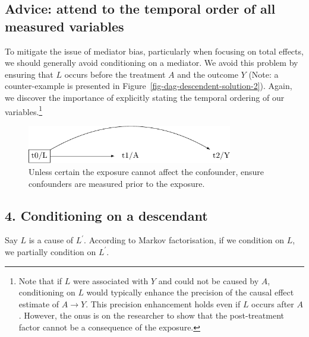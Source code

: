 \documentclass[
  singlecolumn]{report}
\begin{document}
\hypertarget{advice-attend-to-the-temporal-order-of-all-measured-variables-2}{%
\subsection{Advice: attend to the temporal order of all measured
variables}\label{advice-attend-to-the-temporal-order-of-all-measured-variables-2}}

To mitigate the issue of mediator bias, particularly when focusing on
total effects, we should generally avoid conditioning on a mediator. We
avoid this problem by ensuring that \(L\) occurs before the treatment
\(A\) and the outcome \(Y\) (Note: a counter-example is presented in
Figure~\ref{fig-dag-descendent-solution-2}). Again, we discover the
importance of explicitly stating the temporal ordering of our
variables.\footnote{Note that if \(L\) were associated with \(Y\) and
  could not be caused by \(A\), conditioning on \(L\) would typically
  enhance the precision of the causal effect estimate of \(A \to Y\).
  This precision enhancement holds even if \(L\) occurs after \(A\).
  However, the onus is on the researcher to show that the post-treatment
  factor cannot be a consequence of the exposure.}

\begin{figure}

{\centering \includegraphics[width=0.8\textwidth,height=\textheight]{causal-dags_files/figure-pdf/fig-dag-mediator-solution-1.pdf}

}

\caption{\label{fig-dag-mediator-solution}Unless certain the exposure
cannot affect the confounder, ensure confounders are measured prior to
the exposure.}

\end{figure}

\hypertarget{conditioning-on-a-descendant}{%
\subsection{4. Conditioning on a
descendant}\label{conditioning-on-a-descendant}}

Say \(L\) is a cause of \(L^\prime\). According to Markov factorisation,
if we condition on \(L\), we partially condition on \(L^\prime\).
\end{document}
